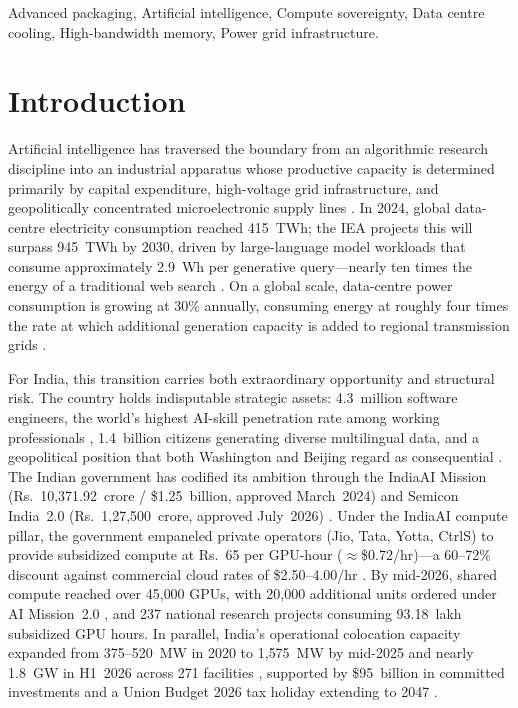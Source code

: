 \documentclass[conference]{IEEEtran}
\begin{document}
\begin{IEEEkeywords}
Advanced packaging, Artificial intelligence, Compute sovereignty, Data centre cooling, High-bandwidth memory, Power grid infrastructure.
\end{IEEEkeywords}

\section{Introduction}

Artificial intelligence has traversed the boundary from an algorithmic research discipline into an industrial apparatus whose productive capacity is determined primarily by capital expenditure, high-voltage grid infrastructure, and geopolitically concentrated microelectronic supply lines \cite{akimitsu2026chokepoints}. In 2024, global data-centre electricity consumption reached 415~TWh; the IEA projects this will surpass 945~TWh by 2030, driven by large-language model workloads that consume approximately 2.9~Wh per generative query---nearly ten times the energy of a traditional web search \cite{iea2024aienergy}. On a global scale, data-centre power consumption is growing at 30\% annually, consuming energy at roughly four times the rate at which additional generation capacity is added to regional transmission grids \cite{swaminathan2026vertical}.

For India, this transition carries both extraordinary opportunity and structural risk. The country holds indisputable strategic assets: 4.3~million software engineers, the world's highest AI-skill penetration rate among working professionals \cite{linkedin2025aiindex}, 1.4~billion citizens generating diverse multilingual data, and a geopolitical position that both Washington and Beijing regard as consequential \cite{stimson2026sovereign}. The Indian government has codified its ambition through the IndiaAI Mission (Rs.~10{,}371.92~crore / \$1.25~billion, approved March~2024) \cite{meity2024indiaai} and Semicon India~2.0 (Rs.~1{,}27{,}500~crore, approved July~2026) \cite{ism2025semicon,pib2026semicon2}. Under the IndiaAI compute pillar, the government empaneled private operators (Jio, Tata, Yotta, CtrlS) to provide subsidized compute at Rs.~65 per GPU-hour ($\approx$\$0.72/hr)---a 60--72\% discount against commercial cloud rates of \$2.50--4.00/hr \cite{sbicap2025datacentre,eetimes2026aimission}. By mid-2026, shared compute reached over 45{,}000 GPUs, with 20{,}000 additional units ordered under AI Mission~2.0 \cite{eetimes2026aimission}, and 237 national research projects consuming 93.18~lakh subsidized GPU hours. In parallel, India's operational colocation capacity expanded from 375--520~MW in 2020 to 1{,}575~MW by mid-2025 and nearly 1.8~GW in H1~2026 across 271 facilities \cite{cushman2026h1,ceew2026datacentre}, supported by \$95~billion in committed investments and a Union Budget 2026 tax holiday extending to 2047 \cite{ceew2026datacentre}.
\end{document}
